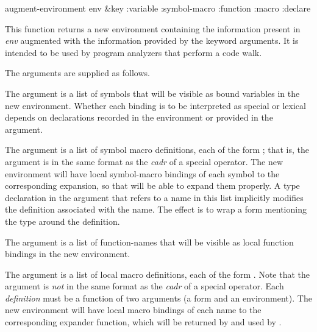 \begin{defun}[Function]
augment-environment env &key :variable :symbol-macro :function :macro :declare

  This function returns a new environment containing the information present in
  \emph{env} augmented with the information provided by the keyword arguments.  It is
  intended to be used by program analyzers that perform a code walk.

  The arguments are supplied as follows.
\begin{flushdesc}
\item[\cd{:variable}]
     The argument is a list of symbols that will be visible as bound variables in
                the new environment.  Whether each binding is to be interpreted
                as special or lexical depends on  declarations recorded
                in the environment or provided in the  argument.

\item[\cd{:symbol-macro}]
 The argument is a list of symbol macro definitions, each of the form
                ; that is, the argument is
                in the same format as the
                \emph{cadr} of a  special operator.  The new environment
                will have local symbol-macro bindings of each symbol to the
                corresponding expansion, so that  will be able to
                expand them properly.  A type declaration in the 
                argument that refers to a name in this list implicitly
                modifies the definition associated with the name.  The effect
                is to wrap a  form mentioning the type around the
                definition.

\item[\cd{:function}]
     The argument is a list of function-names that will be visible as local
                function bindings in the new environment.

\item[\cd{:macro}]
        The argument is a list of local macro definitions, 
        each of the form .
        Note that the argument is \emph{not}
                in the same format as the
                \emph{cadr} of a  special operator.
                Each \emph{definition} must be a function of two
                arguments (a form and an environment).  The new environment
                will have local macro bindings of each name to the
                corresponding expander function, which will be returned by
                 and used by .


\end{flushdesc}
\end{defun}
